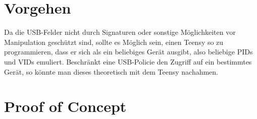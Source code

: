 			\section{Vorgehen}
Da die USB-Felder nicht durch Signaturen oder sonstige Möglichkeiten vor Manipulation geschützt sind, sollte es Möglich sein, einen Teensy so zu programmieren, dass er sich als ein beliebiges Gerät ausgibt, also beliebige PIDs und VIDs emuliert. Beschränkt eine USB-Policie den Zugriff auf ein bestimmtes Gerät, so könnte man dieses theoretisch mit dem Teensy nachahmen.

			\section{Proof of Concept} \label{PoC}